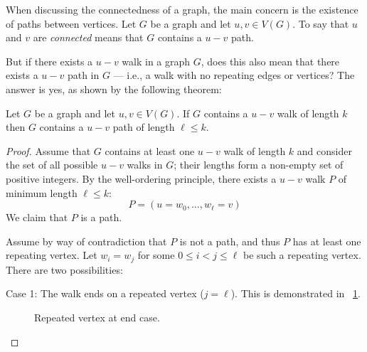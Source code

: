 When discussing the connectedness of a graph, the main concern is the existence of paths between vertices.  Let
\(G\) be a graph and let \(u,v\in V(G)\).  To say that \(u\) and \(v\) are \emph{connected} means that \(G\)
contains a \(u-v\) path.

But if there exists a \(u-v\) walk in a graph \(G\), does this also mean that there exists a \(u-v\) path in \(G\)
--- i.e., a walk with no repeating edges or vertices?  The answer is yes, as shown by the following theorem:

\begin{theorem}
  Let \(G\) be a graph and let \(u,v\in V(G)\).  If \(G\) contains a \(u-v\) walk of length \(k\) then \(G\)
  contains a \(u-v\) path of length \(\ell\le k\).
\end{theorem}

\begin{proof}
  Assume that \(G\) contains at least one \(u-v\) walk of length \(k\) and consider the set of all possible \(u-v\)
  walks in \(G\); their lengths form a non-empty set of positive integers.  By the well-ordering principle, there
  exists a \(u-v\) walk \(P\) of minimum length \(\ell\le k\):
  \[P=(u=w_0,\ldots,w_{\ell}=v)\]
  We claim that \(P\) is a path.

  Assume by way of contradiction that \(P\) is not a path, and thus \(P\) has at least one repeating vertex.  Let
  \(w_i=w_j\) for some \(0\le i<j\le\ell\) be such a repeating vertex.  There are two possibilities:
  
  \begin{description}
  \item Case 1: The walk ends on a repeated vertex (\(j=\ell\)).  This is demonstrated in
    \figurename~\ref{fig:rend}.

    \begin{figure}[H]
      \centering
      \caption{Repeated vertex at end case.}
      \label{fig:rend}
    \end{figure}


\end{description}
\end{proof}
